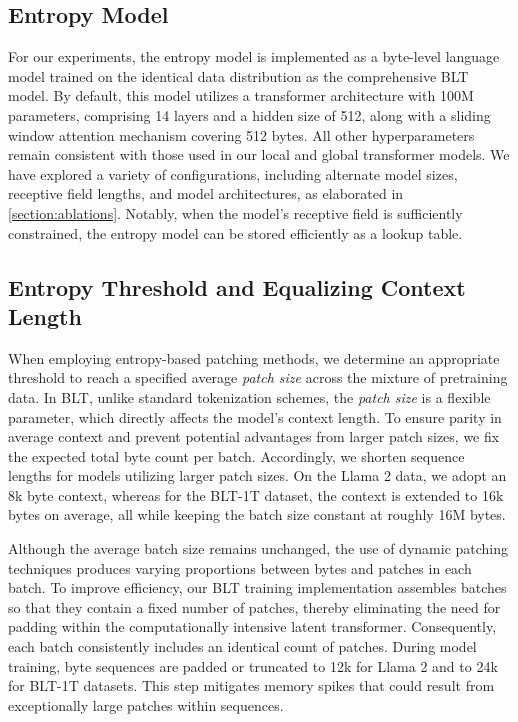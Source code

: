 \subsection{Entropy Model} For our experiments, the entropy model is implemented as a byte-level language model trained on the identical data distribution as the comprehensive {\textsc BLT} model. By default, this model utilizes a transformer architecture with 100M parameters, comprising 14 layers and a hidden size of 512, along with a sliding window attention mechanism covering 512 bytes. All other hyperparameters remain consistent with those used in our local and global transformer models. We have explored a variety of configurations, including alternate model sizes, receptive field lengths, and model architectures, as elaborated in \autoref{section:ablations}. Notably, when the model’s receptive field is sufficiently constrained, the entropy model can be stored efficiently as a lookup table.

\subsection{Entropy Threshold and Equalizing Context Length} When employing entropy-based patching methods, we determine an appropriate threshold to reach a specified average \textit{patch size} across the mixture of pretraining data. In {\textsc BLT}, unlike standard tokenization schemes, the \textit{patch size} is a flexible parameter, which directly affects the model's context length. To ensure parity in average context and prevent potential advantages from larger patch sizes, we fix the expected total byte count per batch. Accordingly, we shorten sequence lengths for models utilizing larger patch sizes. On the Llama 2 data, we adopt an 8k byte context, whereas for the {\textsc BLT}-1T dataset, the context is extended to 16k bytes on average, all while keeping the batch size constant at roughly 16M bytes.

Although the average batch size remains unchanged, the use of dynamic patching techniques produces varying proportions between bytes and patches in each batch. To improve efficiency, our {\textsc BLT} training implementation assembles batches so that they contain a fixed number of patches, thereby eliminating the need for padding within the computationally intensive latent transformer. Consequently, each batch consistently includes an identical count of patches. During model training, byte sequences are padded or truncated to 12k for Llama 2 and to 24k for {\textsc BLT}-1T datasets. This step mitigates memory spikes that could result from exceptionally large patches within sequences.

